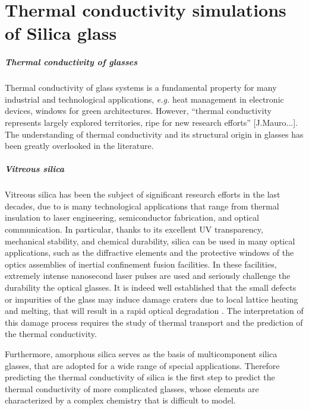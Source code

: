 \chapter{Thermal conductivity simulations of Silica glass}


\paragraph{Thermal conductivity of glasses}
Thermal conductivity of glass systems is a fundamental property for many industrial and technological applications, \emph{e.g.} heat management in electronic devices, windows for green architectures.
However, ``thermal conductivity represents largely explored territories, ripe for new research efforts'' [J.Mauro...]\cite{MauroFM14,Mauro2014}. The understanding of thermal conductivity and its structural origin in glasses has been greatly overlooked in the literature. 

\paragraph{Vitreous silica}
Vitreous silica has been the subject of significant research efforts in the last decades, due to is many technological applications that range from thermal insulation to laser engineering, semiconductor fabrication, and optical communication.
In particular, thanks to its excellent UV transparency, mechanical stability, and chemical durability, silica can be used in many optical applications, such as the diffractive elements and the protective windows of the optics assemblies of inertial confinement fusion facilities. In these facilities, extremely intense nanosecond laser pulses are used and seriously challenge the durability the optical glasses. It is indeed well established that the small defects or impurities of the glass may induce damage craters due to local lattice heating and melting, that will result in a rapid optical degradation \cite{Miller2004,Canaud2004,Miller2010,Chambonneau2014,Kuzuu1999,Stuart1995,Wong2006,Carr2010,Saito2000}. The interpretation of this damage process requires the study of thermal transport and the prediction of the thermal conductivity. 

Furthermore, amorphous silica serves as the basis of multicomponent silica glasses, that are adopted for a wide range of special applications. 
Therefore predicting the thermal conductivity of silica is the first step to predict the thermal conductivity of more complicated glasses, whose elements are characterized by a complex chemistry that is difficult to model.

